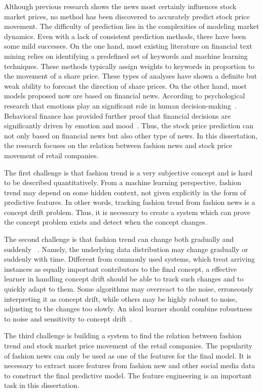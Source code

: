 Although previous research shows the news most certainly influences stock market prices, no method has been discovered to accurately predict stock price movement. The difficulty of prediction lies in the complexities of modeling market dynamics. Even with a lack of consistent prediction methods, there have been some mild successes. On the one hand, most existing literature on financial text mining relies on identifying a predefined set of keywords and machine learning techniques. These methods typically assign weights to keywords in proportion to the movement of a share price. These types of analyses have shown a definite but weak ability to forecast the direction of share prices. On the other hand, most models proposed now are based on financial news. According to psychological research that emotions play an significant role in human decision-making~\cite{kahneman2013prospect}. Behavioral finance has provided further proof that financial decisions are significantly driven by emotion and mood~\cite{nofsinger2005social}. Thus, the stock price prediction can not only based on financial news but also other type of news. In this dissertation, the research focuses on the relation between fashion news and stock price movement of retail companies. 

The first challenge is that fashion trend is a very subjective concept and is hard to be described quantitatively. From a machine learning perspective, fashion trend may depend on some hidden context, not given explicitly in the form of predictive features. In other words, tracking fashion trend from fashion news is a concept drift problem. Thus, it is necessary to create a system which can prove the concept problem exists and detect when the concept changes.

The second challenge is that fashion trend can change both gradually and suddenly ~\cite{behling1985}. Namely, the underlying data distribution may change gradually or suddenly with time. Different from commonly used systems, which treat arriving instances as equally important contributors to the final concept, a effective learner in handling concept drift should be able to track such changes and to quickly adapt to them. Some algorithms may overreact to the noise, erroneously interpreting it as concept drift, while others may be highly robust to noise, adjusting to the changes too slowly. An ideal learner should combine robustness to noise and sensitivity to concept drift~\cite{widmer1996learning}.

The third challenge is building a system to find the relation between fashion trend and stock market price movement of the retail companies. The popularity of fashion news can only be used as one of the features for the final model. It is necessary to extract more features from fashion new and other social media data to construct the final predictive model. The feature engineering is an important task in this dissertation.


